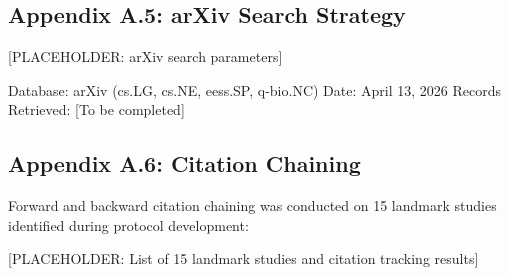 \subsection{Appendix A.5: arXiv Search Strategy}

[PLACEHOLDER: arXiv search parameters]

Database: arXiv (cs.LG, cs.NE, eess.SP, q-bio.NC)  
Date: April 13, 2026  
Records Retrieved: [To be completed]

\subsection{Appendix A.6: Citation Chaining}

Forward and backward citation chaining was conducted on 15 landmark studies identified during protocol development:

[PLACEHOLDER: List of 15 landmark studies and citation tracking results]

